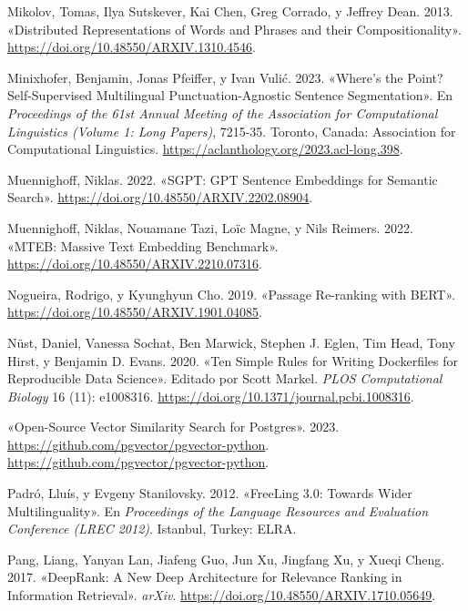 \documentclass[
  12pt,
  openany]{book}
\newlength{\cslhangindent}
\newlength{\cslentryspacingunit} %
\newenvironment{CSLReferences}[2] %
 {%
  \setlength{\parindent}{0pt}
  \ifodd #1
  \let\oldpar\par
  \def\par{\hangindent=\cslhangindent\oldpar}
  \fi
  \setlength{\parskip}{#2\cslentryspacingunit}
 }%
 {}
\begin{document}
\begin{CSLReferences}{1}{0}
\leavevmode{}%
Mikolov, Tomas, Ilya Sutskever, Kai Chen, Greg Corrado, y Jeffrey Dean. 2013. {«Distributed Representations of Words and Phrases and their Compositionality»}. \url{https://doi.org/10.48550/ARXIV.1310.4546}.

\leavevmode{}%
Minixhofer, Benjamin, Jonas Pfeiffer, y Ivan Vulić. 2023. {«Where{'}s the Point? Self-Supervised Multilingual Punctuation-Agnostic Sentence Segmentation»}. En \emph{Proceedings of the 61st Annual Meeting of the Association for Computational Linguistics (Volume 1: Long Papers)}, 7215-35. Toronto, Canada: Association for Computational Linguistics. \url{https://aclanthology.org/2023.acl-long.398}.

\leavevmode{}%
Muennighoff, Niklas. 2022. {«SGPT: GPT Sentence Embeddings for Semantic Search»}. \url{https://doi.org/10.48550/ARXIV.2202.08904}.

\leavevmode{}%
Muennighoff, Niklas, Nouamane Tazi, Loïc Magne, y Nils Reimers. 2022. {«MTEB: Massive Text Embedding Benchmark»}. \url{https://doi.org/10.48550/ARXIV.2210.07316}.

\leavevmode{}%
Nogueira, Rodrigo, y Kyunghyun Cho. 2019. {«Passage Re-ranking with BERT»}. \url{https://doi.org/10.48550/ARXIV.1901.04085}.

\leavevmode{}%
Nüst, Daniel, Vanessa Sochat, Ben Marwick, Stephen J. Eglen, Tim Head, Tony Hirst, y Benjamin D. Evans. 2020. {«Ten Simple Rules for Writing Dockerfiles for Reproducible Data Science»}. Editado por Scott Markel. \emph{PLOS Computational Biology} 16 (11): e1008316. \url{https://doi.org/10.1371/journal.pcbi.1008316}.

\leavevmode{}%
{«Open-Source Vector Similarity Search for Postgres»}. 2023. \url{https://github.com/pgvector/pgvector-python}. \url{https://github.com/pgvector/pgvector-python}.

\leavevmode{}%
Padró, Lluís, y Evgeny Stanilovsky. 2012. {«FreeLing 3.0: Towards Wider Multilinguality»}. En \emph{Proceedings of the Language Resources and Evaluation Conference (LREC 2012)}. Istanbul, Turkey: ELRA.

\leavevmode{}%
Pang, Liang, Yanyan Lan, Jiafeng Guo, Jun Xu, Jingfang Xu, y Xueqi Cheng. 2017. {«DeepRank: A New Deep Architecture for Relevance Ranking in Information Retrieval»}. \emph{arXiv}. \url{https://doi.org/10.48550/ARXIV.1710.05649}.


\end{CSLReferences}
\end{document}
